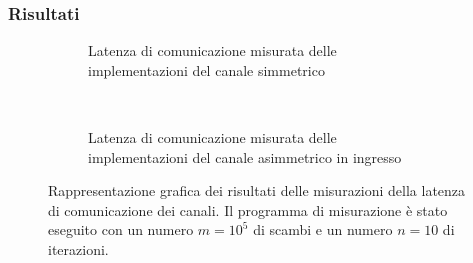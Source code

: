 \subsubsection{Risultati}
\label{sct:meter_risultati}
\begin{figure}[p]
  \centering
  \begin{subfigure}[b]{.5\textheight}
    \resizebox{\columnwidth}{!}{}
    \caption{Latenza di comunicazione misurata delle implementazioni del canale simmetrico}
    \label{fig:meter_ch_sym_2_4}
  \end{subfigure}
  \\
  \vspace{1cm}
  \begin{subfigure}[b]{.5\textheight}
    \resizebox{\columnwidth}{!}{}
    \caption{Latenza di comunicazione misurata delle implementazioni del canale asimmetrico in ingresso}
    \label{fig:meter_ch_asymin_2_4}
  \end{subfigure}
  \caption[Latenza di comunicazione dei canali]{Rappresentazione grafica dei risultati delle misurazioni della latenza di comunicazione dei canali. Il programma di misurazione \`e stato eseguito con un numero $m = 10^5$ di scambi e un numero $n = 10$ di iterazioni.}
  \label{fig:meter_type2_nscamb4}
\end{figure}

